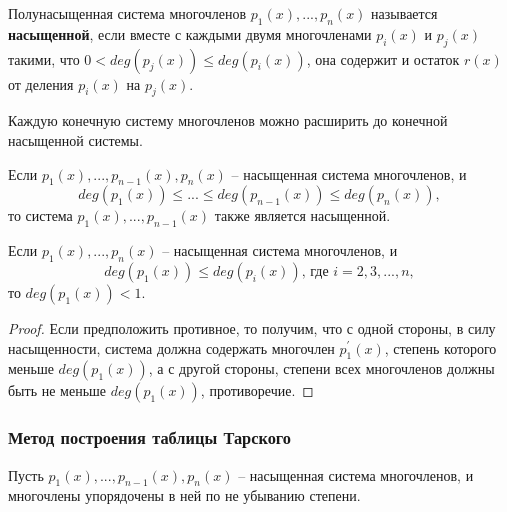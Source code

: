 \begin{definition}\cite{lect1}
    Полунасыщенная система многочленов $p_1(x), ... , p_n(x)$ называется \textbf{насыщенной}, если вместе с каждыми двумя многочленами $p_i(x)$ и $p_j(x)$ такими, что $0 < deg(p_j(x)) \leq deg(p_i(x))$, она содержит и остаток $r(x)$ от деления $p_i(x)$ на $p_j(x)$. 
\end{definition}

\begin{proposal}\cite{lect1}
    Каждую конечную систему многочленов можно расширить до конечной насыщенной системы.
\end{proposal}

\begin{proposal}\label{subsystem}\cite{lect1}
    Если $p_1(x), ... , p_{n-1}(x), p_n(x)$ -- насыщенная система многочленов, и 
    \begin{equation*}
        deg(p_1(x)) \leq ... \leq deg(p_{n-1}(x)) \leq deg(p_n(x)),
    \end{equation*}
    то система $p_1(x), ... , p_{n-1}(x)$ также является насыщенной.
\end{proposal}

\begin{proposal}\label{min deg}
    Если $p_1(x), ... , p_n(x)$ -- насыщенная система многочленов, и 
    \begin{equation*}
        deg(p_1(x)) \leq deg(p_i(x)),\,\text{где $i = 2, 3, ... , n$},
    \end{equation*}
    то $deg(p_1(x)) < 1$.
\end{proposal}
\begin{proof}
    Если предположить противное, то получим, что с одной стороны, в силу насыщенности, система должна содержать многочлен $p_1^\prime(x)$, степень которого меньше $deg(p_1(x))$, а с другой стороны, степени всех многочленов должны быть не меньше $deg(p_1(x))$, противоречие.
\end{proof}

\subsubsection{Метод построения таблицы Тарского}

Пусть $p_1(x), ... , p_{n-1}(x), p_n(x)$ -- насыщенная система многочленов, и многочлены упорядочены в ней по не убыванию степени.

